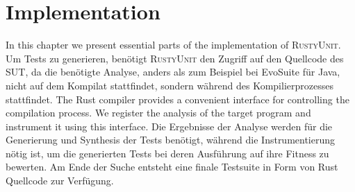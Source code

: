 \documentclass[paper=a4,%
  twoside,%
  BCOR4mm,%
  abstract=true,%
  toc=bibliography,%
  chapterprefix=true,%
  toc=bibliographynumbered,%
  open=right,%
  english,%
  pagesize=pdftex]{scrreprt}
\begin{document}


\clearpage
\chapter{Implementation}
\label{chap:implementation}
In this chapter we present essential parts of the implementation of \textsc{RustyUnit}. Um Tests zu generieren, benötigt \textsc{RustyUnit} den Zugriff auf den Quellcode des SUT, da die benötigte Analyse, anders als zum Beispiel bei EvoSuite für Java, nicht auf dem Kompilat stattfindet, sondern während des Kompilierprozesses stattfindet. The Rust compiler provides a convenient interface for controlling the compilation process. We register the analysis of the target program and instrument it using this interface. Die Ergebnisse der Analyse werden für die Generierung und Synthesis der Tests benötigt, während die Instrumentierung nötig ist, um die generierten Tests bei deren Ausführung auf ihre Fitness zu bewerten. Am Ende der Suche entsteht eine finale Testsuite in Form von Rust Quellcode zur Verfügung.
\end{document}
